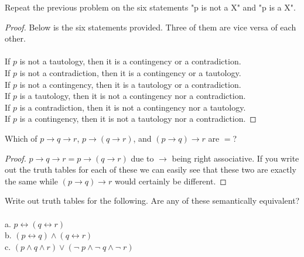 \documentclass[12pt]{article}
\newenvironment{exercise}[2][Exercise]{\begin{trivlist}
\item[\hskip \labelsep {\bfseries #1}\hskip \labelsep {\bfseries #2.}]}{\end{trivlist}}
\begin{document}
\begin{exercise}{16}
Repeat the previous problem on the six statements "p is not a X" and "p is a X".
\end{exercise}

\begin{proof}
Below is the six statements provided. Three of them are vice versa of each other. \\ \\
If $p$ is not a tautology, then it is a contingency or a contradiction. \\
If $p$ is not a contradiction, then it is a contingency or a tautology. \\
If $p$ is not a contingency, then it is a tautology or a contradiction. \\
If $p$ is a tautology, then it is not a contingency nor a contradiction. \\
If $p$ is a contradiction, then it is not a contingency nor a tautology. \\
If $p$ is a contingency, then it is not a tautology nor a contradiction.

\end{proof}

\begin{exercise}{17}
Which of $p \rightarrow q \rightarrow r$, $p \rightarrow (q \rightarrow r)$, and $(p \rightarrow q) \rightarrow r$ are $=$? 
\end{exercise}

\begin{proof}
$p \rightarrow q \rightarrow r = p \rightarrow (q \rightarrow r)$ due to $\rightarrow$ being right associative. If you write out the truth tables for each of these we can easily see that these two are exactly the same while $(p \rightarrow q) \rightarrow r$ would certainly be different. 

\end{proof}

\begin{exercise}{18}
Write out truth tables for the following. Are any of these semantically equivalent? \\ \\
a. $p \leftrightarrow (q \leftrightarrow r)$ \\
b. $(p \leftrightarrow q) \land (q \leftrightarrow r)$ \\ 
c. $(p \land q \land r) \lor (\neg\; p \land \neg\; q \land \neg\; r)$
\end{exercise}
\end{document}

